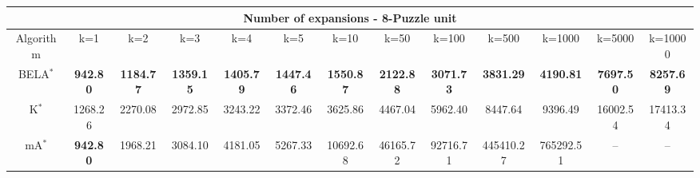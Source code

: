 \begin{tabular}{c|cccccccccccc}\toprule
\multicolumn{13}{c}{Number of expansions - 8-Puzzle unit}\\ \midrule
Algorithm & k=1 & k=2 & k=3 & k=4 & k=5 & k=10 & k=50 & k=100 & k=500 & k=1000 & k=5000 & k=10000 \\ \midrule
BELA$^*$ & \textbf{942.80} & \textbf{1184.77} & \textbf{1359.15} & \textbf{1405.79} & \textbf{1447.46} & \textbf{1550.87} & \textbf{2122.88} & \textbf{3071.73} & \textbf{3831.29} & \textbf{4190.81} & \textbf{7697.50} & \textbf{8257.69} \\
K$^*$ & 1268.26 & 2270.08 & 2972.85 & 3243.22 & 3372.46 & 3625.86 & 4467.04 & 5962.40 & 8447.64 & 9396.49 & 16002.54 & 17413.34 \\
mA$^*$ & \textbf{942.80} & 1968.21 & 3084.10 & 4181.05 & 5267.33 & 10692.68 & 46165.72 & 92716.71 & 445410.27 & 765292.51 & -- & -- \\ \bottomrule 
\end{tabular}
